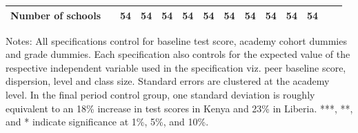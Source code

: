 \begin{center}
\begin{scriptsize}
\begin{threeparttable}
\begin{tabular} {@{} l l c c c c c c c c c c c  c@{}}
Number of schools &  & 54 & 54 & 54 & 54 & 54 & 54 & 54 & 54 & 54 & 54 \\
\bottomrule
\end{tabular}
\begin{tablenotes}
\item Notes: All specifications control for baseline test score, academy cohort dummies and grade dummies. Each specification also controls for the expected value of the respective independent variable used in the specification viz. peer baseline score, dispersion, level and class size. Standard errors are clustered at the academy level. In the final period control group, one standard deviation is roughly equivalent to an 18\% increase in test scores in Kenya and 23\% in Liberia. ***, **, and * indicate significance at 1\%, 5\%, and 10\%.\end{tablenotes}
\end{threeparttable}
\end{scriptsize}
\end{center}
\clearpage

